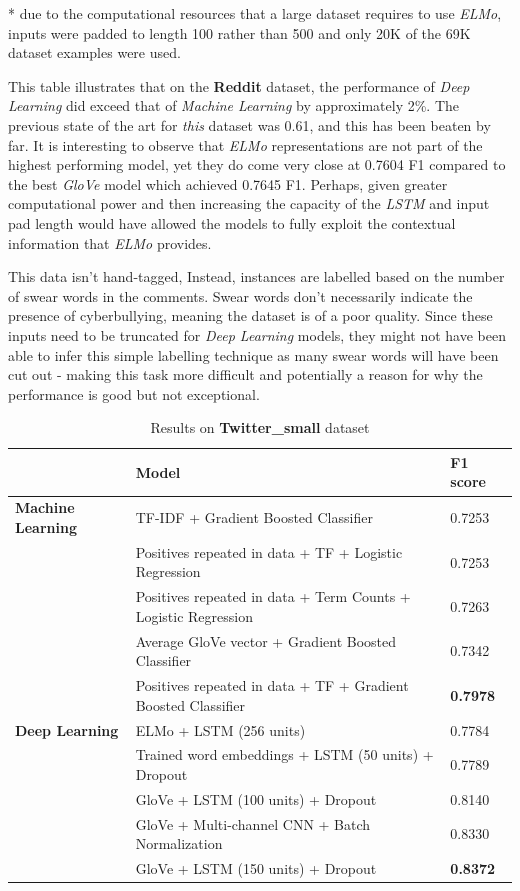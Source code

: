 \documentclass[12pt,a4paper]{article}
\begin{document}
* due to the computational resources that a large dataset requires to use \textit{ELMo}, inputs were padded to length 100 rather than 500 and only 20K of the 69K dataset examples were used. \newline

This table illustrates that on the \textbf{Reddit} dataset, the performance of \textit{Deep Learning} did exceed that of \textit{Machine Learning} by approximately 2\%. The previous state of the art for \textit{this} dataset was 0.61, and this has been beaten by far. It is interesting to observe that \textit{ELMo} representations are not part of the highest performing model, yet they do come very close at 0.7604 F1 compared to the best \textit{GloVe} model which achieved 0.7645 F1. Perhaps, given greater computational power and then increasing the capacity of the \textit{LSTM} and input pad length would have allowed the models to fully exploit the contextual information that \textit{ELMo} provides.

This data isn't hand-tagged, Instead, instances are labelled based on the number of swear words in the comments. Swear words don't necessarily indicate the presence of cyberbullying, meaning the dataset is of a poor quality. Since these inputs need to be truncated for \textit{Deep Learning} models, they might not have been able to infer this simple labelling technique as many swear words will have been cut out - making this task more difficult and potentially a reason for why the performance is good but not exceptional.

\begin{table}[H]
	\centering
	\vspace*{-12pt}
	\caption{Results on \textbf{Twitter\_small} dataset}
	\label{results2}
	\hspace*{-0.8cm}
	\begin{tabular}{p{3.4cm} p{11cm} p{2cm}} \hline\hline
		& \textbf{Model} & \textbf{F1 score}  \\ \hline
		\textbf{Machine Learning} & TF-IDF + Gradient Boosted Classifier & 0.7253 \\
		& Positives repeated in data + TF + Logistic Regression & 0.7253 \\
		& Positives repeated in data + Term Counts + Logistic Regression & 0.7263 \\
		& Average GloVe vector + Gradient Boosted Classifier & 0.7342 \\
		& Positives repeated in data + TF + Gradient Boosted Classifier & \textbf{0.7978} \\ \hline
		
		\textbf{Deep Learning} & ELMo + LSTM (256 units) & 0.7784 \\
		& Trained word embeddings + LSTM (50 units) + Dropout & 0.7789 \\
		& GloVe + LSTM (100 units) + Dropout & 0.8140 \\ 
		& GloVe + Multi-channel CNN + Batch Normalization & 0.8330 \\ 
		& GloVe + LSTM (150 units) + Dropout & \textbf{0.8372} \\\hline
	\end{tabular}
\end{table}
\end{document}
